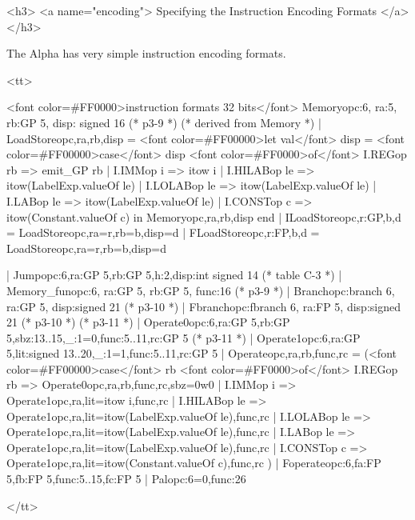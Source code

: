 <h3> <a name="encoding">
     Specifying the Instruction Encoding Formats </a></h3>

    The Alpha has very simple instruction encoding formats.

<tt>
\begin{SML}
   <font color=#FF0000>instruction formats 32 bits</font>
     Memory{opc:6, ra:5, rb:GP 5, disp: signed 16} (* p3-9 *)
      (* derived from Memory *) 
   | LoadStore{opc,ra,rb,disp} =
       <font color=#FF00000>let val</font> disp = 
           <font color=#FF00000>case</font> disp <font color=#FF0000>of</font>
             I.REGop rb => emit_GP rb
           | I.IMMop i  => itow i
           | I.HILABop le => itow(LabelExp.valueOf le)
           | I.LOLABop le => itow(LabelExp.valueOf le)
           | I.LABop le => itow(LabelExp.valueOf le)
           | I.CONSTop c => itow(Constant.valueOf c)
       in  Memory{opc,ra,rb,disp}
       end
   | ILoadStore{opc,r:GP,b,d} = LoadStore{opc,ra=r,rb=b,disp=d}
   | FLoadStore{opc,r:FP,b,d} = LoadStore{opc,ra=r,rb=b,disp=d}

   | Jump{opc:6,ra:GP 5,rb:GP 5,h:2,disp:int signed 14}   (* table C-3 *)
   | Memory_fun{opc:6, ra:GP 5, rb:GP 5, func:16}     (* p3-9 *)
   | Branch{opc:branch 6, ra:GP 5, disp:signed 21}           (* p3-10 *)
   | Fbranch{opc:fbranch 6, ra:FP 5, disp:signed 21}          (* p3-10 *)
        (* p3-11 *)
   | Operate0{opc:6,ra:GP 5,rb:GP 5,sbz:13..15,_:1=0,func:5..11,rc:GP 5} 
        (* p3-11 *)
   | Operate1{opc:6,ra:GP 5,lit:signed 13..20,_:1=1,func:5..11,rc:GP 5} 
   | Operate{opc,ra,rb,func,rc} =
        (<font color=#FF00000>case</font> rb <font color=#FF0000>of</font>
          I.REGop rb => Operate0{opc,ra,rb,func,rc,sbz=0w0}
        | I.IMMop i  => Operate1{opc,ra,lit=itow i,func,rc}
        | I.HILABop le => Operate1{opc,ra,lit=itow(LabelExp.valueOf le),func,rc}
        | I.LOLABop le => Operate1{opc,ra,lit=itow(LabelExp.valueOf le),func,rc}
        | I.LABop le => Operate1{opc,ra,lit=itow(LabelExp.valueOf le),func,rc}
        | I.CONSTop c => Operate1{opc,ra,lit=itow(Constant.valueOf c),func,rc}
        )
   | Foperate{opc:6,fa:FP 5,fb:FP 5,func:5..15,fc:FP 5}
   | Pal{opc:6=0,func:26}
\end{SML}
</tt>

